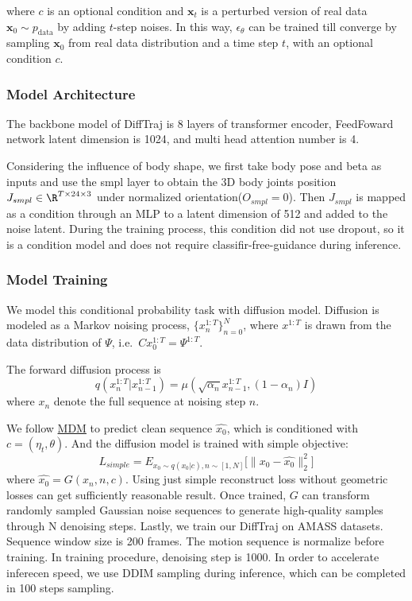 \documentclass{article}
\begin{document}
where \(c\) is an optional condition and \(\mathbf{x}_t\) is a perturbed version of real data \(\mathbf{x}_0 \sim p_{\text{data}}\) by adding \(t\)-step noises. In this way, \(\epsilon_\theta\) can be trained till converge by sampling \(\mathbf{x}_0\) from real data distribution and a time step \(t\), with an optional condition \(c\).

\subsubsection{Model Architecture}\label{model-architecture}

The backbone model of DiffTraj is 8 layers of transformer encoder, FeedFoward network latent dimension is 1024, and multi head attention number is 4.

Considering the influence of body shape, we first take body pose and beta as inputs and use the smpl layer to obtain the 3D body joints position \(J_{smpl} \in \R^{T \times 24 \times 3}\) under normalized orientation(\(O_{smpl}=0\)). Then \(J_{smpl}\) is mapped as a condition through an MLP to a latent dimension of 512 and added to the noise latent. During the training process, this condition did not use dropout, so it is a condition model and does not require classifir-free-guidance during inference.

\subsubsection{Model Training}\label{model-training}

We model this conditional probability task with diffusion model. Diffusion is modeled as a Markov noising process, \({\{x^{1:T}_n\}_{n=0}^N}\), where \(x^{1:T}\) is drawn from the data distribution of \(\Psi\), i.e.~\(Cx^{1:T}_0=\Psi^{1:T}\).

The forward diffusion process is \[
q(x_{n}^{1:T}|x_{n-1}^{1:T}) = \mu(\sqrt{\alpha_n}x_{n-1}^{1:T}, (1-\alpha_n)I)
\] where \(x_{n}\) denote the full sequence at noising step \(n\).

We follow \href{https://github.com/GuyTevet/motion-diffusion-model}{MDM} to predict clean sequence \(\hat{x_0}\), which is conditioned with \(c=(\eta_t,\theta)\). And the diffusion model is trained with simple objective: \[
L_{simple} = E_{x_0 \sim q(x_0|c),n \sim [1,N]} \big[\big\|x_0-\hat{x_0}\big\|^2_2\big]
\] where \(\hat{x_0} = G(x_n,n,c)\). Using just simple reconstruct loss without geometric losses can get sufficiently reasonable result. Once trained, \(G\) can transform randomly sampled Gaussian noise sequences to generate high-quality samples through N denoising steps. Lastly, we train our DiffTraj on AMASS datasets. Sequence window size is 200 frames. The motion sequence is normalize before training. In training procedure, denoising step is 1000. In order to accelerate inferecen speed, we use DDIM sampling during inference, which can be completed in 100 steps sampling.
\end{document}
